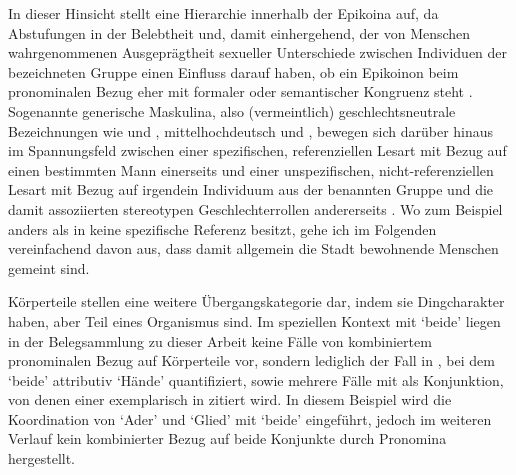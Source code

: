 In dieser Hinsicht stellt \citet[172--174]{klein2022} eine Hierarchie innerhalb
der Epikoina auf, da Abstufungen in der Belebtheit und, damit einhergehend, der
von Menschen wahrgenommenen Ausgeprägtheit sexueller Unterschiede zwischen
Individuen der bezeichneten Gruppe einen Einfluss darauf haben, ob ein
Epikoinon beim pronominalen Bezug eher mit formaler oder semantischer Kongruenz
steht \autocite[vgl.~auch][74--83]{kotthoffnuebling2018}. Sogenannte generische
Maskulina, also (vermeintlich) geschlechtsneutrale
Bezeichnungen wie  und ,
mittelhochdeutsch  und ,
bewegen sich darüber hinaus im Spannungsfeld zwischen einer spezifischen,
referenziellen Lesart mit Bezug auf einen bestimmten Mann
einerseits und einer unspezifischen, nicht-referenziellen Lesart mit Bezug auf
irgendein Individuum aus der benannten Gruppe und die damit assoziierten
stereotypen Geschlechterrollen andererseits
\autocites[91--122]{kotthoffnuebling2018}[159--160, 179--180]{klein2022}. Wo
zum Beispiel  anders als in  keine
spezifische Referenz besitzt, gehe ich im Folgenden vereinfachend davon aus,
dass damit allgemein die Stadt bewohnende Menschen gemeint sind.



Körperteile stellen eine weitere Übergangskategorie dar, indem sie
Dingcharakter haben, aber Teil eines Organismus sind. Im
speziellen Kontext mit  `beide' liegen in der Belegsammlung zu
dieser Arbeit keine Fälle von kombiniertem pronominalen Bezug auf Körperteile
vor, sondern lediglich der Fall in , bei dem 
`beide' attributiv  `Hände' quantifiziert, sowie
mehrere Fälle mit  als Konjunktion, von denen einer exemplarisch in
 zitiert wird. In diesem Beispiel wird die Koordination
von  `Ader' und  `Glied' mit 
`beide' eingeführt, jedoch im weiteren Verlauf kein kombinierter Bezug auf
beide Konjunkte durch Pronomina hergestellt.

